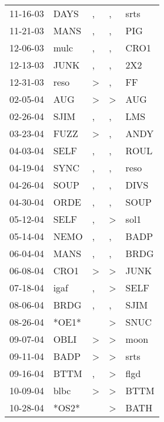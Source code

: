 \begin{supertabular}{lllll}
 11-16-03 &   DAYS &                , &                , &   srts \\
 11-21-03 &   MANS &                , &                , &    PIG \\
 12-06-03 &   mulc &                , &                , &   CRO1 \\
 12-13-03 &   JUNK &                , &                , &    2X2 \\
 12-31-03 &   reso &     \textgreater &                , &     FF \\
 02-05-04 &    AUG &     \textgreater &     \textgreater &    AUG \\
 02-26-04 &   SJIM &                , &                , &    LMS \\
 03-23-04 &   FUZZ &     \textgreater &                , &   ANDY \\
 04-03-04 &   SELF &                , &                , &   ROUL \\
 04-19-04 &   SYNC &                , &                , &   reso \\
 04-26-04 &   SOUP &                , &                , &   DIVS \\
 04-30-04 &   ORDE &                , &                , &   SOUP \\
 05-12-04 &   SELF &                , &     \textgreater &   sol1 \\
 05-14-04 &   NEMO &                , &                , &   BADP \\
 06-04-04 &   MANS &                , &                , &   BRDG \\
 06-08-04 &   CRO1 &     \textgreater &     \textgreater &   JUNK \\
 07-18-04 &   igaf &                , &     \textgreater &   SELF \\
 08-06-04 &   BRDG &                , &                , &   SJIM \\
 08-26-04 &  *OE1* &                  &     \textgreater &   SNUC \\
 09-07-04 &   OBLI &     \textgreater &     \textgreater &   moon \\
 09-11-04 &   BADP &     \textgreater &     \textgreater &   srts \\
 09-16-04 &   BTTM &                , &     \textgreater &   flgd \\
 10-09-04 &   blbc &     \textgreater &     \textgreater &   BTTM \\
 10-28-04 &  *OS2* &                  &     \textgreater &   BATH \\

\end{supertabular}
